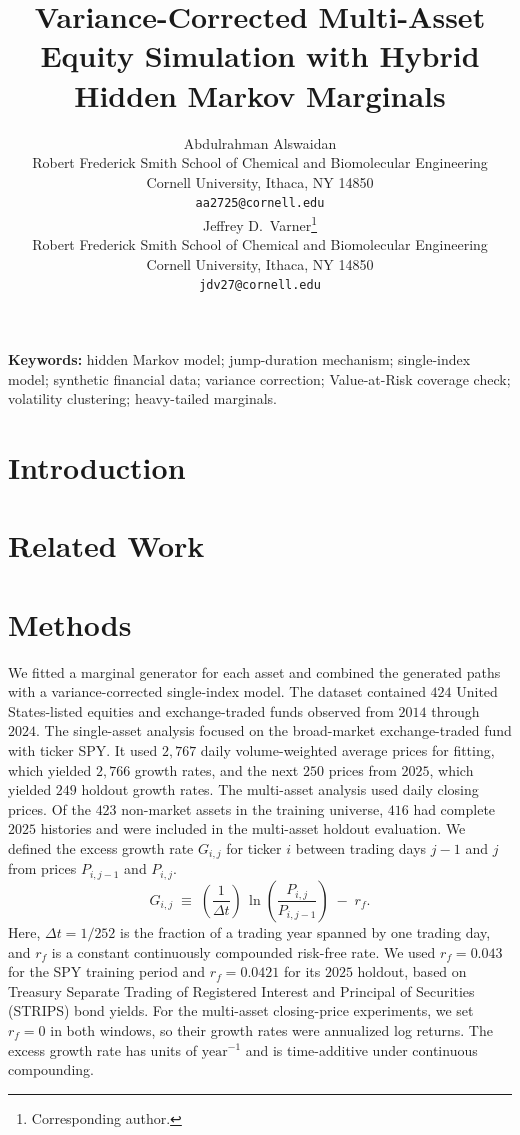 \documentclass{article}
\title{Variance-Corrected Multi-Asset Equity Simulation with Hybrid Hidden Markov Marginals}
\author{%
  Abdulrahman Alswaidan \\
  Robert Frederick Smith School of Chemical and Biomolecular Engineering \\
  Cornell University, Ithaca, NY 14850 \\
  \texttt{aa2725@cornell.edu} \\
  \And
  Jeffrey D.~Varner\thanks{Corresponding author.} \\
  Robert Frederick Smith School of Chemical and Biomolecular Engineering \\
  Cornell University, Ithaca, NY 14850 \\
  \texttt{jdv27@cornell.edu} \\
}
\theoremstyle{definition}
\theoremstyle{remark}
\begin{document}
\raggedbottom
{}

\maketitle

\begin{abstract}

\end{abstract}

\vspace{0.5em}
\noindent\textbf{Keywords:} hidden Markov model; jump-duration mechanism; single-index model; synthetic financial data; variance correction; Value-at-Risk coverage check; volatility clustering; heavy-tailed marginals.

\section{Introduction}\label{sec:introduction}


\section{Related Work}\label{sec:related-work}


\section{Methods}\label{sec:method}

We fitted a marginal generator for each asset and combined the generated
paths with a variance-corrected single-index model. The
dataset contained $424$ United States-listed equities and
exchange-traded funds observed from $2014$ through $2024$. The
single-asset analysis focused on the broad-market exchange-traded fund
with ticker SPY. It used
$2{,}767$ daily volume-weighted average prices for fitting, which
yielded $2{,}766$ growth rates, and the next $250$ prices from $2025$,
which yielded $249$ holdout growth rates. The multi-asset analysis
used daily closing prices. Of the $423$ non-market assets in the
training universe, $416$ had complete $2025$ histories and were included
in the multi-asset holdout evaluation. We defined the excess growth rate
$G_{i,j}$ for ticker $i$ between trading days $j-1$ and $j$ from prices
$P_{i,j-1}$ and $P_{i,j}$.
\begin{equation}
    G_{i,j} \;\equiv\; \left(\frac{1}{\Delta t}\right)\,
    \ln\!\left( \frac{P_{i,j}}{P_{i,j-1}} \right) \;-\; r_f.
    \label{eq:growth_rate}
\end{equation}
Here, $\Delta t = 1/252$ is the fraction of a trading year spanned by
one trading day, and $r_f$ is a constant continuously compounded
risk-free rate. We used $r_f=0.043$ for the SPY training period and
$r_f=0.0421$ for its $2025$ holdout, based on Treasury Separate Trading
of Registered Interest and Principal of Securities (STRIPS) bond yields.
For the multi-asset closing-price experiments, we set $r_f=0$ in both
windows, so their growth rates were annualized log returns.
The excess growth rate
has units of $\mathrm{year}^{-1}$ and is time-additive under
continuous compounding.
\end{document}
